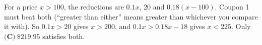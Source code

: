 For a price $x>100$, the reductions are $0.1x$, $20$ and $0.18(x-100)$. Coupon 1 must beat both (``greater than either'' means greater than whichever you compare it with). So $0.1x>20$ gives $x>200$, and $0.1x>0.18x-18$ gives $x<225$. Only $\boxed{\textbf{(C)}\ \$219.95}$ satisfies both.
